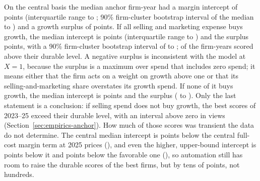 On the central basis the median anchor firm-year had a margin intercept of \AnchorMzeroNetMed{} points (interquartile range \AnchorMzeroNetLo{} to \AnchorMzeroNetHi; 90\% firm-cluster bootstrap interval of the median \AnchorMzeroNetCiLo{} to \AnchorMzeroNetCiHi) and a growth surplus of \AnchorPiNetMed{} points. If all selling and marketing expense buys growth, the median intercept is \AnchorMzeroMed{} points (interquartile range \AnchorMzeroLo{} to \AnchorMzeroHi) and the surplus \AnchorPiMed{} points, with a 90\% firm-cluster bootstrap interval of \AncPiUbEoneLo{} to \AncPiUbEoneHi; \AnchorPiUbPos{} of the \AnchorN{} firm-years scored above their durable level. A negative surplus is inconsistent with the model at $X=1$, because the surplus is a maximum over spend that includes zero spend; it means either that the firm acts on a weight on growth above one or that its selling-and-marketing share overstates its growth spend. If none of it buys growth, the median intercept is \AnchorMzeroLbMed{} points and the surplus \AnchorPiLbMed{} (\AncPiLbEoneLo{} to \AncPiLbEoneHi). Only the last statement is a conclusion: if selling spend does not buy growth, the best scores of 2023--25 exceed their durable level, with an interval above zero in \AncPiLbCount{} views (Section~\ref{sec:empirics-anchor}). How much of those scores was transient the data do not determine. The central median intercept is \AnchorGapCenNet{} points below the central full-cost margin term at 2025 prices (\MarginCenR), and even the higher, upper-bound intercept is \AnchorGapCen{} points below it and \AnchorGapFav{} points below the favorable one (\MarginFavR), so automation still has room to raise the durable scores of the best firms, but by tens of points, not hundreds.



